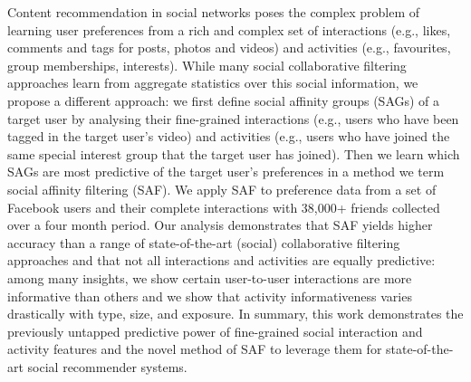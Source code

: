 Content recommendation in social networks poses the complex problem of
learning user preferences from a rich and complex set of interactions
(e.g., likes, comments and tags for posts, photos and videos) and
activities (e.g., favourites, group memberships, interests).  While
many social collaborative filtering approaches learn from aggregate statistics over this
social information, we propose a different approach: we first define
social affinity groups (SAGs) of a target user by analysing their
fine-grained interactions (e.g., users who have been tagged in the
target user's video) and activities (e.g., users who have joined the
same special interest group that the target user has joined).  Then we
learn which SAGs are most predictive of the target user's preferences
in a method we term social affinity filtering (SAF).  We apply SAF to
preference data from a set of Facebook users and their
complete interactions with 38,000+ friends collected over a four month
period.  Our analysis demonstrates that SAF yields higher accuracy
than a range of state-of-the-art (social) collaborative filtering approaches and that not all
interactions and activities are equally predictive: among many insights, 
we show certain user-to-user interactions are more
informative than others %
and we show that activity informativeness varies drastically with type, size, 
and exposure.  In summary, this work demonstrates the previously untapped
predictive power of fine-grained social interaction and activity
features and the novel method of SAF to leverage them for
state-of-the-art social recommender systems.

